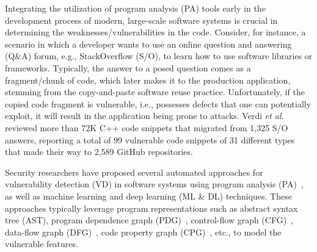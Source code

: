 Integrating the utilization of program analysis (PA) tools early in the development process of modern, large-scale software systems is crucial in determining the weaknesses/vulnerabilities in the code. Consider, for instance, a scenario in which a developer wants to use an online question and answering (Q\&A) forum, e.g., StackOverflow (S/O), to learn how to use software libraries or frameworks. Typically, the answer to a posed question comes as a fragment/chunk of code, which later makes it to the production application, stemming from the copy-and-paste software reuse practice. Unfortunately, if the copied code fragment is vulnerable, i.e., possesses defects that one can potentially exploit, it will result in the application being prone to attacks. Verdi {\em et al.}~\cite{verdi-tse22} reviewed more than 72K C++ code snippets that migrated from 1,325 S/O answers, reporting a total of 99 vulnerable code snippets of 31 different types that made their way to 2,589 GitHub repositories.

Security researchers have proposed several automated approaches for vulnerability detection (VD) in software systems using program analysis (PA)~\cite{FlawFinder,RATS,viega2000its4,Checkmarx,HPFortify,Coverity}, as well as machine learning and deep learning (ML \& DL) \cite{fse21,chakraborty2020deep,zhou2019devign,li2018sysevr,li2018vuldeepecker} techniques. These approaches typically leverage program representations such as abstract syntax tree (AST), program dependence graph (PDG)~\cite{fse21,li2018vuldeepecker}, control-flow graph (CFG)~\cite{zhou2019devign}, data-flow graph (DFG)~\cite{zhou2019devign}, code property graph (CPG)~\cite{chakraborty2020deep}, etc., to model the vulnerable features. 


